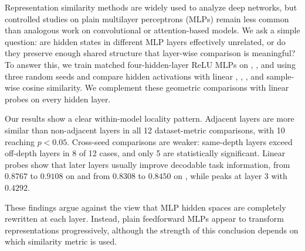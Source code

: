 Representation similarity methods are widely used to analyze deep networks, but controlled studies on plain multilayer perceptrons (MLPs) remain less common than analogous work on convolutional or attention-based models. We ask a simple question: are hidden states in different MLP layers effectively unrelated, or do they preserve enough shared structure that layer-wise comparison is meaningful? To answer this, we train matched four-hidden-layer ReLU MLPs on \mnist, \fashionmnist, and \cifar using three random seeds and compare hidden activations with linear \cka, \svcca, \pwcca, and sample-wise cosine similarity. We complement these geometric comparisons with linear probes on every hidden layer.

Our results show a clear within-model locality pattern. Adjacent layers are more similar than non-adjacent layers in all 12 dataset-metric comparisons, with 10 reaching $p<0.05$. Cross-seed comparisons are weaker: same-depth layers exceed off-depth layers in 8 of 12 cases, and only 5 are statistically significant. Linear probes show that later layers usually improve decodable task information, from $0.8767$ to $0.9108$ on \mnist and from $0.8308$ to $0.8450$ on \fashionmnist, while \cifar peaks at layer 3 with $0.4292$.

These findings argue against the view that MLP hidden spaces are completely rewritten at each layer. Instead, plain feedforward MLPs appear to transform representations progressively, although the strength of this conclusion depends on which similarity metric is used.
